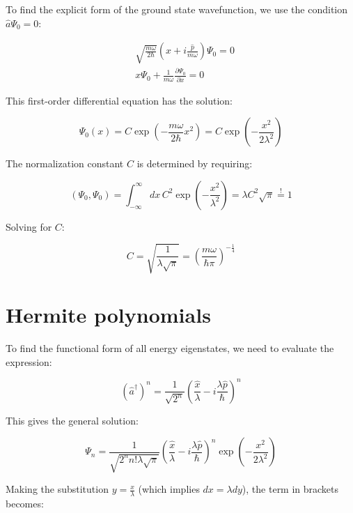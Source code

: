 To find the explicit form of the ground state wavefunction, we use the condition $\hat{a}\Psi_0 = 0$:

\begin{align}
&\sqrt{\frac{m\omega}{2\hbar}}\left(x + i\frac{\hat{p}}{m\omega}\right)\Psi_0 = 0  \\
&x\Psi_0 + \frac{1}{m\omega}\frac{\partial\Psi_0}{\partial x} = 0
\end{align}

This first-order differential equation has the solution:

\begin{equation}
\Psi_0(x) = C\exp\left(-\frac{m\omega}{2\hbar}x^2\right) = C\exp\left(-\frac{x^2}{2\lambda^2}\right)
\end{equation}

The normalization constant $C$ is determined by requiring:

\begin{equation}
(\Psi_0, \Psi_0) = \int_{-\infty}^{\infty}dx\,C^2\exp\left(-\frac{x^2}{\lambda^2}\right) = \lambda C^2\sqrt{\pi} \stackrel{!}{=} 1
\end{equation}

Solving for $C$:

\begin{equation}
C = \sqrt{\frac{1}{\lambda\sqrt{\pi}}} = \left(\frac{m\omega}{\hbar\pi}\right)^{-\frac{1}{4}}
\end{equation}

\section{Hermite polynomials}

To find the functional form of all energy eigenstates, we need to evaluate the expression:

\begin{equation}
(\hat{a}^\dagger)^n = \frac{1}{\sqrt{2^n}}\left(\frac{\hat{x}}{\lambda} - i\frac{\lambda\hat{p}}{\hbar}\right)^n
\end{equation}

This gives the general solution:

\begin{equation}
\Psi_n = \frac{1}{\sqrt{2^n n!\lambda\sqrt{\pi}}}\left(\frac{\hat{x}}{\lambda} - i\frac{\lambda\hat{p}}{\hbar}\right)^n\exp\left(-\frac{x^2}{2\lambda^2}\right)
\end{equation}

Making the substitution $y = \frac{x}{\lambda}$ (which implies $dx = \lambda dy$), the term in brackets becomes:

